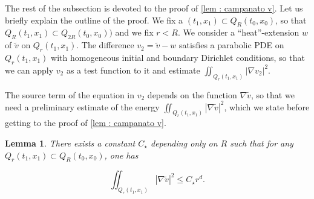\documentclass[reqno,12pt,twoside]{amsart}
\newtheorem{lemma}{Lemma}[section]
\numberwithin{equation}{section} \numberwithin{theorem}{section}
\numberwithin{proposition}{section} \numberwithin{lemma}{section}
\numberwithin{corollary}{section}
\numberwithin{definition}{section} \numberwithin{remark}{section}
\begin{document}
%

The rest of the subsection is devoted to the proof of \autoref{lem : campanato v}. Let us briefly explain the outline of the proof. 
We fix a $(t_1, x_1) \subset Q_R(t_0, x_0)$, so that $Q_R(t_1, x_1) \subset Q_{2R}(t_0,x_0))$ and we fix $r <R$. 
We consider a ``heat''-extension $w$  of $\widetilde{v}$ on $Q_{r}(t_1,x_1)$. The difference $v_2 =\widetilde{v}-w$ satisfies a parabolic PDE  on $Q_{r}(t_1,x_1)$ with homogeneous initial and boundary Dirichlet conditions, so that we can apply $v_2$ as a test function to it and estimate $\iint_{Q_{r}(t_1,x_1)} |\nabla v_2|^2$. 

\smallskip

The source term of the equation in $v_2$ depends on the function $\nabla \widetilde{v}$, so that we need a preliminary estimate of the energy $\iint_{Q_{r}(t_1,x_1)} |\nabla \widetilde{v}|^2$, which we state before getting to the proof of \autoref{lem : campanato v}. 

\begin{lemma}\label{lem : energie tilv}
There exists a constant $C_\star$ depending only on $R$ such that for any $Q_{r}(t_1, x_1) \subset Q_R(t_0, x_0)$, one has 

\[\iint_{Q_{r}(t_1, x_1)} |\nabla \widetilde{v}|^2 \leqslant C_\star r^d.\]
\end{lemma}
\end{document}
